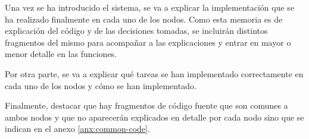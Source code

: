 Una vez se ha introducido el sistema, se va a explicar la implementación
que se ha realizado finalmente en cada uno de los nodos. Como esta memoria es de
explicación del código y de las decisiones tomadas, se incluirán distintos fragmentos
del mismo para acompañar a las explicaciones y entrar en mayor o menor detalle
en las funciones.

Por otra parte, se va a explicar qué tareas se han implementado correctamente en cada
uno de los nodos y cómo se han implementado.

Finalmente, destacar que hay fragmentos de código fuente que son comunes a ambos nodos
y que no aparecerán explicados en detalle por cada nodo sino que se indican en el anexo
\ref{anx:common-code}.